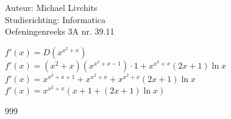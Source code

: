 \documentclass[a4paper]{article}
\begin{document}
  
\noindent \large Auteur: Michael Livchits \\
\noindent \large Studierichting: Informatica\\
\noindent \large Oefeningenreeks 3A nr. 39.11\\

\medskip

\normalsize

$f'(x) = D\left(x^{x^2+x}\right)$\\

$f'(x) = (x^2+x)\left(x^{x^2+x-1}\right)\cdot 1 + x^{x^2+x}(2x+1)\ln x$\\

$f'(x) = x^{x^2+x+1}+x^{x^2+x}+x^{x^2+x}(2x+1)\ln x$\\

$f'(x) = x^{x^2+x}\left(x+1+(2x+1)\ln x\right)$\\


\begin{thebibliography}{999}
\end{thebibliography}
\end{document}
